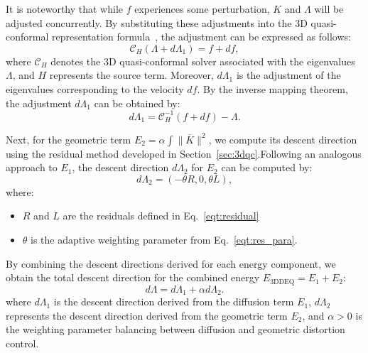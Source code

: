 \documentclass{article}
\begin{document}
It is noteworthy that while $f$ experiences some perturbation, $K$ and $\Lambda$ will be adjusted concurrently. By substituting these adjustments into the 3D quasi-conformal representation formula~\cite{chen2024novel3dmappingrepresentation}, the adjustment can be expressed as follows:
\begin{equation}
    \mathcal{C}_{H}(\Lambda + d\Lambda_1) = f + df,
\end{equation}
where $\mathcal{C}_{H}$ denotes the 3D quasi-conformal solver associated with the eigenvalues $\Lambda$, and $H$ represents the source term. Moreover, $d\Lambda_1$ is the adjustment of the eigenvalues corresponding to the velocity $df$. By the inverse mapping theorem, the adjustment $d\Lambda_1$ can be obtained by:
\begin{equation}\label{eqt:eig_update_1}
    d\Lambda_1 = \mathcal{C}^{-1}_{H}(f + df) - \Lambda.
\end{equation}

Next, for the geometric term $E_2 = \alpha \int \|\overline{K} \| ^2$, we compute its descent direction using the residual method developed in Section~\ref{sec:3dqc}.Following an analogous approach to $E_1$, the descent direction $d\Lambda_2$ for $E_2$ can be computed by:
\begin{equation}\label{eqt:eig_update_2}
    d\Lambda_2 = \left(- \theta R, 0 , \theta L \right),
\end{equation}
where:
\begin{itemize}
\item $R$ and $L$ are the residuals defined in Eq.~\eqref{eqt:residual}
\item $\theta$ is the adaptive weighting parameter from Eq.~\eqref{eqt:res_para}.
\end{itemize}

By combining the descent directions derived for each energy component, we obtain the total descent direction for the combined energy $E_{\text{3DDEQ}} = E_1 + E_2$:
\begin{equation}
    d\Lambda = d\Lambda_1 + \alpha d\Lambda_2.
\end{equation}
where $d\Lambda_1$ is the descent direction derived from the diffusion term $E_1$,  $d\Lambda_2$ represents the descent direction derived from the geometric term $E_2$, and $\alpha > 0$ is the weighting parameter balancing between diffusion and geometric distortion control.
\end{document}

